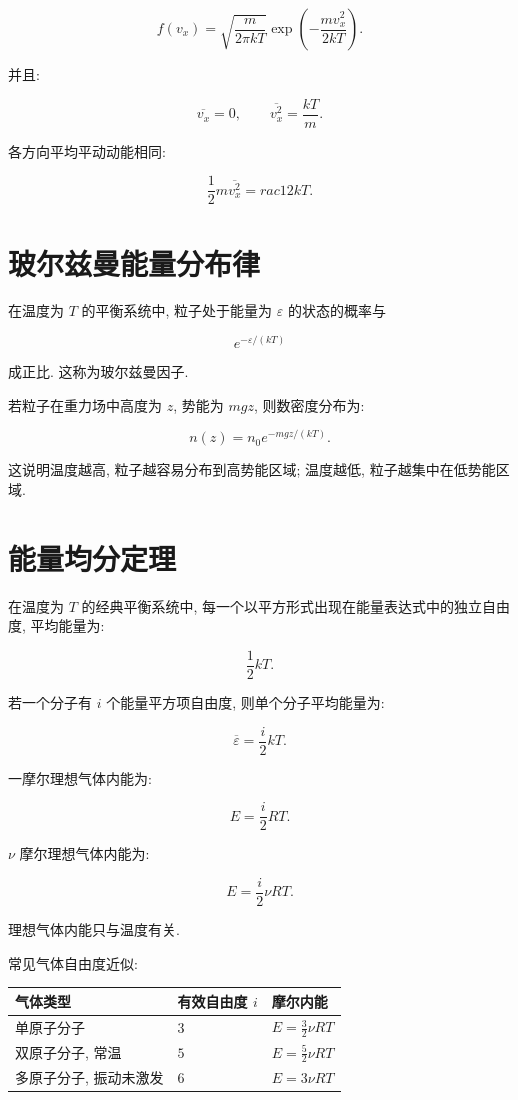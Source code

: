 \documentclass[
  a4paper,
]{ctexrep}
\begin{document}
\[
f(v_x)=\sqrt{\frac{m}{2\pi kT}}\exp\left(-\frac{mv_x^2}{2kT}\right).
\]

并且:

\[
\overline{v_x}=0,
\qquad
\overline{v_x^2}=\frac{kT}{m}.
\]

各方向平均平动动能相同:

\[
\frac{1}{2}m\overline{v_x^2}=
rac{1}{2}kT.
\]

\section{玻尔兹曼能量分布律}\label{ux73bbux5c14ux5179ux66fcux80fdux91cfux5206ux5e03ux5f8b}

在温度为 \(T\) 的平衡系统中, 粒子处于能量为 \(\varepsilon\)
的状态的概率与

\[
e^{-\varepsilon/(kT)}
\]

成正比. 这称为玻尔兹曼因子.

若粒子在重力场中高度为 \(z\), 势能为 \(mgz\), 则数密度分布为:

\[
n(z)=n_0e^{-mgz/(kT)}.
\]

这说明温度越高, 粒子越容易分布到高势能区域; 温度越低,
粒子越集中在低势能区域.

\section{能量均分定理}\label{ux80fdux91cfux5747ux5206ux5b9aux7406}

在温度为 \(T\) 的经典平衡系统中,
每一个以平方形式出现在能量表达式中的独立自由度, 平均能量为:

\[
\frac{1}{2}kT.
\]

若一个分子有 \(i\) 个能量平方项自由度, 则单个分子平均能量为:

\[
\overline{\varepsilon}=\frac{i}{2}kT.
\]

一摩尔理想气体内能为:

\[
E=\frac{i}{2}RT.
\]

\(\nu\) 摩尔理想气体内能为:

\[
E=\frac{i}{2}\nu RT.
\]

理想气体内能只与温度有关.

常见气体自由度近似:

\begin{longtable}[]{@{}lll@{}}
\toprule\noalign{}
气体类型 & 有效自由度 \(i\) & 摩尔内能 \\
\midrule\noalign{}
\endhead
\bottomrule\noalign{}
\endlastfoot
单原子分子 & \(3\) & \(E=\frac{3}{2}\nu RT\) \\
双原子分子, 常温 & \(5\) & \(E=\frac{5}{2}\nu RT\) \\
多原子分子, 振动未激发 & \(6\) & \(E=3\nu RT\) \\
\end{longtable}
\end{document}
